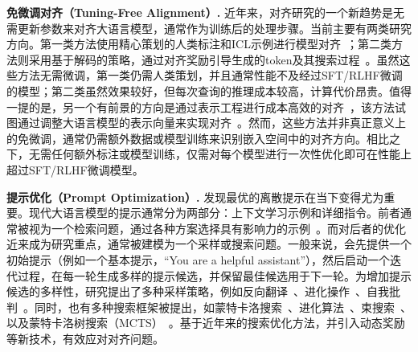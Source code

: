 \noindent \textbf{免微调对齐（Tuning-Free Alignment）.}
近年来，对齐研究的一个新趋势是无需更新参数来对齐大语言模型，通常作为训练后的处理步骤。当前主要有两类研究方向。第一类方法使用精心策划的人类标注和ICL示例进行模型对齐~\cite{han2023context, Lin2024ReAlign, zhao2024context}；第二类方法则采用基于解码的策略，通过对齐奖励引导生成的token及其搜索过程~\cite{li2023rain, khanov2024args, huang2024deal}。虽然这些方法无需微调，第一类仍需人类策划，并且通常性能不及经过SFT/RLHF微调的模型；第二类虽然效果较好，但每次查询的推理成本较高，计算代价昂贵。值得一提的是，另一个有前景的方向是通过表示工程进行成本高效的对齐~\cite{zou2023representation, wu2024reft}，该方法试图通过调整大语言模型的表示向量来实现对齐~\cite{li2024inference, kong2024aligning, wang2024inferaligner}。然而，这些方法并非真正意义上的免微调，通常仍需额外数据或模型训练来识别嵌入空间中的对齐方向。相比之下，\ours 无需任何额外标注或模型训练，仅需对每个模型进行一次性优化即可在性能上超过SFT/RLHF微调模型。

\noindent \textbf{提示优化（Prompt Optimization）.}
发现最优的离散提示在当下变得尤为重要。现代大语言模型的提示通常分为两部分：上下文学习示例和详细指令。前者通常被视为一个检索问题，通过各种方案选择具有影响力的示例~\cite{rubin2021learning, dong2022survey}。而对后者的优化近来成为研究重点，通常被建模为一个采样或搜索问题。一般来说，会先提供一个初始提示（例如一个基本提示，“You are a helpful assistant”），然后启动一个迭代过程，在每一轮生成多样的提示候选，并保留最佳候选用于下一轮。为增加提示候选的多样性，研究提出了多种采样策略，例如反向翻译~\cite{xu2022gps}、进化操作~\cite{fernando2023promptbreeder}、自我批判~\cite{wang2023promptagent}。同时，也有多种搜索框架被提出，如蒙特卡洛搜索~\cite{zhou2022large}、进化算法~\cite{fernando2023promptbreeder, yang2023large}、束搜索~\cite{pryzant2023automatic}、以及蒙特卡洛树搜索（MCTS）~\cite{wang2023promptagent}。\ours 基于近年来的搜索优化方法，并引入动态奖励等新技术，有效应对对齐问题。
